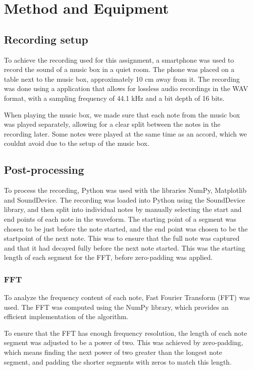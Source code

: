 \chapter{Method and Equipment}

\section{Recording setup}

To achieve the recording used for this assignment, a smartphone was used to record the sound of a music box in a quiet room. The phone was placed on a table next to the music box, approximately 10 cm away from it. The recording was done using a application that allows for lossless audio recordings in the WAV format, with a sampling frequency of 44.1 kHz and a bit depth of 16 bits.

When playing the music box, we made sure that each note from the music box was played separately, allowing for a clear split between the notes in the recording later. Some notes were played at the same time as an accord, which we couldnt avoid due to the setup of the music box. 

\section{Post-processing}

To process the recording, Python was used with the libraries NumPy, Matplotlib and SoundDevice. The recording was loaded into Python using the SoundDevice library, and then split into individual notes by manually selecting the start and end points of each note in the waveform. The starting point of a segment was chosen to be just before the note started, and the end point was chosen to be the startpoint of the next note. This was to ensure that the full note was captured and that it had decayed fully before the next note started. This was the starting length of each segment for the FFT, before zero-padding was applied. 

\subsection{FFT}

To analyze the frequency content of each note, Fast Fourier Transform (FFT) was used. The FFT was computed using the NumPy library, which provides an efficient implementation of the algorithm.

To ensure that the FFT has enough frequency resolution, the length of each note segment was adjusted to be a power of two. This was achieved by zero-padding, which means finding the next power of two greater than the longest note segment, and padding the shorter segments with zeros to match this length. 

